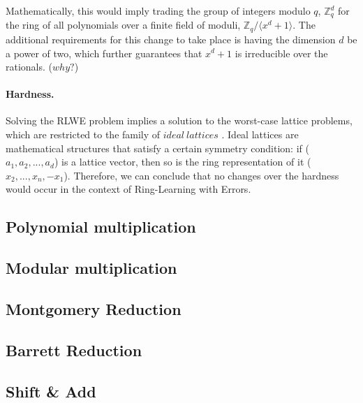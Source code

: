 \documentclass[11pt,
  titlepage=false,
  abstract=on,
]{scrreprt}
\begin{document}
Mathematically, this would imply trading the group of integers modulo $q$, $\mathbb{Z}^d_q$ for the ring of all polynomials over a finite field of moduli, $\mathbb{Z}_q / \langle x^d + 1\rangle$.
The additional requirements for this change  to take place is having the dimension $d$ be a power of two, which further guarantees that $x^d + 1$ is irreducible over the rationals. ($why?$)

\paragraph{Hardness.} Solving the RLWE problem implies a solution to the worst-case lattice problems, which are restricted to the family of $ideal\ lattices$ \cite{lyubashevsky2010ideal}. Ideal lattices are mathematical
structures that satisfy a certain symmetry condition: if ($a_1, a_2,..., a_d$) is a lattice vector, then so is the ring representation of it ($x_2,...,x_n, -x_1$).
Therefore, we can conclude that no changes over the hardness would occur in the context of Ring-Learning with Errors.
\subsection{Polynomial multiplication}
\subsection{Modular multiplication}
\subsection{Montgomery Reduction}
\subsection{Barrett Reduction}
\subsection{Shift \& Add}


\end{document}
